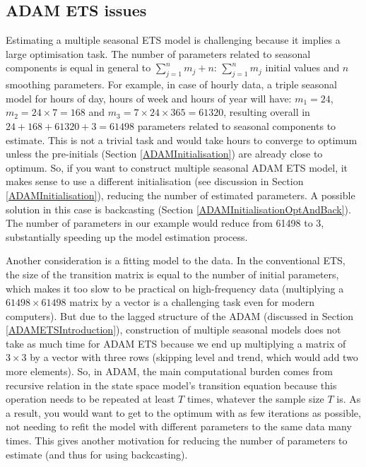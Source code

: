 \documentclass[]{book}
\theoremstyle{definition}
\theoremstyle{definition}
\theoremstyle{definition}
\theoremstyle{definition}
\theoremstyle{remark}
\begin{document}
\hypertarget{adam-ets-issues}{%
\subsection{ADAM ETS issues}\label{adam-ets-issues}}

Estimating a multiple seasonal ETS model is challenging because it implies a large optimisation task. The number of parameters related to seasonal components is equal in general to \(\sum_{j=1}^n m_j + n\): \(\sum_{j=1}^n m_j\) initial values and \(n\) smoothing parameters. For example, in case of hourly data, a triple seasonal model for hours of day, hours of week and hours of year will have: \(m_1 = 24\), \(m_2 = 24 \times 7 = 168\) and \(m_3= 7 \times 24 \times 365 = 61320\), resulting overall in \(24 + 168 + 61320 + 3 = 61498\) parameters related to seasonal components to estimate. This is not a trivial task and would take hours to converge to optimum unless the pre-initials (Section \ref{ADAMInitialisation}) are already close to optimum. So, if you want to construct multiple seasonal ADAM ETS model, it makes sense to use a different initialisation (see discussion in Section \ref{ADAMInitialisation}), reducing the number of estimated parameters. A possible solution in this case is backcasting (Section \ref{ADAMInitialisationOptAndBack}). The number of parameters in our example would reduce from 61498 to 3, substantially speeding up the model estimation process.

Another consideration is a fitting model to the data. In the conventional ETS, the size of the transition matrix is equal to the number of initial parameters, which makes it too slow to be practical on high-frequency data (multiplying a \(61498 \times 61498\) matrix by a vector is a challenging task even for modern computers). But due to the lagged structure of the ADAM (discussed in Section \ref{ADAMETSIntroduction}), construction of multiple seasonal models does not take as much time for ADAM ETS because we end up multiplying a matrix of \(3 \times 3\) by a vector with three rows (skipping level and trend, which would add two more elements). So, in ADAM, the main computational burden comes from recursive relation in the state space model's transition equation because this operation needs to be repeated at least \(T\) times, whatever the sample size \(T\) is. As a result, you would want to get to the optimum with as few iterations as possible, not needing to refit the model with different parameters to the same data many times. This gives another motivation for reducing the number of parameters to estimate (and thus for using backcasting).
\end{document}
